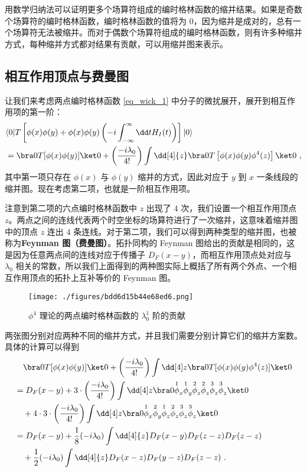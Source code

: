 用数学归纳法可以证明更多个场算符组成的编时格林函数的缩并结果。如果是奇数个场算符的编时格林函数，编时格林函数的值将为 $0$，因为缩并是成对的，总有一个场算符无法被缩并。而对于偶数个场算符组成的编时格林函数，则有许多种缩并方式，每种缩并方式都对结果有贡献，可以用缩并图来表示。
\subsection{相互作用顶点与费曼图}
让我们来考虑两点编时格林函数 \autoref{eq_wick_1} 中分子的微扰展开，展开到相互作用项的第一阶：
\begin{equation}
\begin{aligned}
&\langle 0| T\left[\phi(x)\phi(y)+\phi(x)\phi(y)\left(-i\int_{-\infty}^{\infty}\dd t H_I(t)\right)\right] | 0\rangle\\
&=\bra 0 T[\phi(x)\phi(y)] \ket 0 
+\left(\frac{-i\lambda_0}{4!}\right) \int \dd[4]{z} \bra 0 T\left[ \phi(x)\phi(y)\phi^4(z) \right]\ket 0~,
\end{aligned}
\end{equation}
其中第一项只存在 $\phi(x)$ 与 $\phi(y)$ 缩并的方式，因此对应于 $y$ 到 $x$ 一条线段的缩并图。现在考虑第二项，也就是一阶相互作用项。

注意到第二项的六点编时格林函数中 $z$ 出现了 $4$ 次，我们设置一个相互作用顶点 $z$。两点之间的连线代表两个时空坐标的场算符进行了一次缩并，这意味着缩并图中的顶点 $z$ 连出 $4$ 条连线。对于第二项，我们可以得到两种类型的缩并图，也被称为\textbf{Feynman 图（费曼图）}。拓扑同构的 Feynman 图给出的贡献是相同的，这是因为任意两点间的连线对应于传播子 $D_F(x-y)$，而相互作用顶点处对应与 $\lambda_0$ 相关的常数，所以我们上面得到的两种图实际上概括了所有两个外点、一个相互作用顶点的拓扑上互补等价的 Feynman 图。

\begin{figure}[ht]
\centering
\texttt{[image: ./figures/bdd6d15b44e68ed6.png]}
\caption{$\phi^4$ 理论的两点编时格林函数的 $\lambda_0^1$ 阶的贡献} \label{fig_wick1}
\end{figure}

两张图分别对应两种不同的缩并方式，并且我们需要分别计算它们的缩并方案数。具体的计算可以得到
\begin{equation}
\begin{aligned}
&\quad\bra 0 T[\phi(x)\phi(y)] \ket 0 
+\left(\frac{-i\lambda_0}{4!}\right) \int \dd[4] z \bra 0 T[\phi(x)\phi(y)\phi^4(z) ]\ket 0\\
&=D_F(x-y)+3\cdot \left(\frac{-i\lambda_0}{4!}\right)\int \dd[4] z 
\bra 0 \overset{1}{\phi}_x\overset{1}{\phi}_y \overset{2}{\phi}_z\overset{2}{\phi}_z\overset{3}{\phi}_z \overset{3}{\phi}_z\ket 0\\
&\quad +4\cdot 3 \cdot \left(\frac{-i\lambda_0}{4!}\right)\int \dd[4] z 
\bra 0 \overset{1}{\phi}_x\overset{2}{\phi}_y \overset{1}{\phi}_z\overset{2}{\phi}_z\overset{3}{\phi}_z \overset{3}{\phi}_z\ket 0\\
&=D_F(x-y)+\frac{1}{8} (-i\lambda_0)\int \dd[4]{z} D_F(x-y)D_F(z-z)D_F(z-z) \\
&\quad + \frac{1}{2} (-i\lambda_0)\int \dd[4]{z} D_F(x-z)D_F(y-z)D_F(z-z)~.
\end{aligned}
\end{equation}

